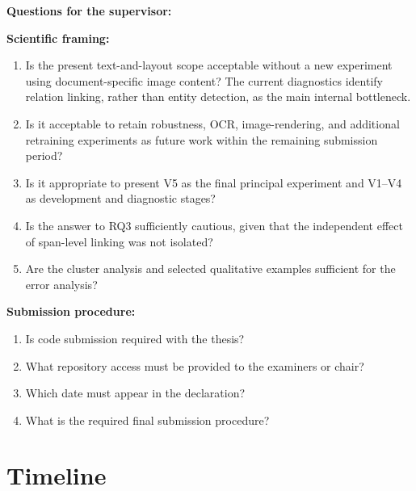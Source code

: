 \documentclass[11pt,a4paper]{article}
\begin{document}
\noindent\textbf{Questions for the supervisor:}
\medskip

\noindent\textbf{Scientific framing:}
\begin{enumerate}[leftmargin=1.5em]
\item Is the present text-and-layout scope acceptable without a new experiment
  using document-specific image content? The current diagnostics identify
  relation linking, rather than entity detection, as the main internal
  bottleneck.
\item Is it acceptable to retain robustness, OCR, image-rendering, and
  additional retraining experiments as future work within the remaining
  submission period?
\item Is it appropriate to present V5 as the final principal experiment and
  V1--V4 as development and diagnostic stages?
\item Is the answer to RQ3 sufficiently cautious, given that the independent
  effect of span-level linking was not isolated?
\item Are the cluster analysis and selected qualitative examples sufficient
  for the error analysis?
\end{enumerate}

\noindent\textbf{Submission procedure:}
\begin{enumerate}[leftmargin=1.5em]
\item Is code submission required with the thesis?
\item What repository access must be provided to the examiners or chair?
\item Which date must appear in the declaration?
\item What is the required final submission procedure?
\end{enumerate}

\section{Timeline}
\end{document}
